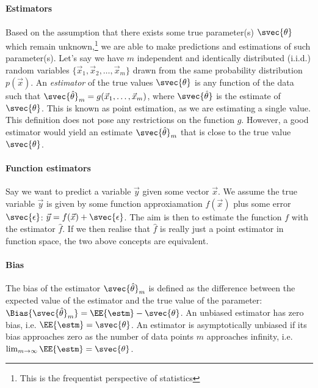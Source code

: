 
        

    \subsection{}

        \paragraph{Estimators} 
        Based on the assumption that there exists some true parameter(s) $\svec{\theta}$ which remain unknown,\footnote{This is the frequentist perspective of statistics} we are able to make predictions and estimations of such parameter(s). Let's say we have $m$ independent and identically distributed (i.i.d.) random variables $\{\vec{x}_1, \vec{x}_2, \dots, \vec{x}_m\}$ drawn from the same probability distribution $p(\vec{x})$. An \textit{estimator} of the true values $\svec{\theta}$ is any function of the data such that $\svec{\hat{\theta}}_m = g(\vec{x}_1,\dots,\vec{x}_m)$, where $\svec{\hat{\theta}}$ is the estimate of $\svec{\theta}$. This is known as point estimation, as we are estimating a single value. This definition does not pose any restrictions on the function $g$. However, a good estimator would yield an estimate $\svec{\hat{\theta}}_m$ that is close to the true value $\svec{\theta}$. 
        \paragraph{Function estimators}
        Say we want to predict a variable $\vec{y}$ given some vector $\vec{x}$. We assume the true variable $\vec{y}$ is given by some function approxiamation $f(\vec{x})$ plus some error $\svec{\epsilon}$: $\vec{y} = f(\vec{x}) + \svec{\epsilon}$. The aim is then to estimate the function $f$ with the estimator $\hat{f}$. If we then realise that $\hat{f}$ is really just a point estimator in function space, the two above concepts are equivalent.

        \paragraph{Bias}
        The bias of the estimator $\svec{\hat{\theta}}_m$ is defined as the difference between the expected value of the estimator and the true value of the parameter: $\Bias{\svec{\hat{\theta}}_m} = \EE{\estm} - \svec{\theta}$. An unbiased estimator has zero bias, i.e. $\EE{\estm} = \svec{\theta}$. An estimator is asymptotically unbiased if its bias approaches zero as the number of data points $m$ approaches infinity, i.e. $\lim_{m\to\infty} \EE{\estm} = \svec{\theta}$.

